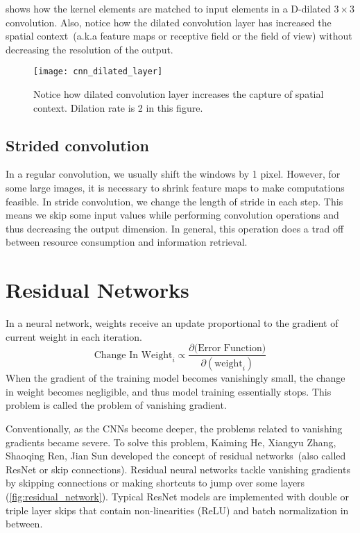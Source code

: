      shows how the kernel elements are matched to input elements in a D-dilated $3\times3$ convolution. Also, notice how the dilated convolution layer has increased the spatial context~(a.k.a feature maps or receptive field or the field of view) without decreasing the resolution of the output.
    \begin{figure}[h!]
        \centering
        \texttt{[image: cnn\_dilated\_layer]}
        \caption[Dilated convolution layer]{Notice how dilated convolution layer increases the capture of spatial context. Dilation rate is 2 in this figure.}
        \label{fig:dilated_layer}
    \end{figure}


\subsection{Strided convolution}
    In a regular convolution, we usually shift the windows by 1 pixel. However, for some large images, it is necessary to shrink feature maps to make computations feasible. In stride convolution, we change the length of stride in each step. This means we skip some input values while performing convolution operations and thus decreasing the output dimension. In general, this operation does a trad off between resource consumption and information retrieval.

\section[Residual Networks]{Residual Networks}\label{sec:resNet}

In a neural network, weights receive an update proportional to the gradient of current weight in each iteration. \begin{equation} \text{Change\ In\ Weight}_{i} \propto \frac{\partial(\text{Error\ Function)}}{\partial(\text{weight}_{i})} \end{equation} When the gradient of the training model becomes vanishingly small, the change in weight becomes negligible, and thus model training essentially stops. This problem is called the problem of vanishing gradient.

Conventionally, as the CNNs become deeper, the problems related to vanishing gradients became severe. To solve this problem, {Kaiming He, Xiangyu Zhang, Shaoqing Ren, Jian Sun}\cite{ResNet} developed the concept of residual networks~(also called ResNet or skip connections). Residual neural networks tackle vanishing gradients by skipping connections or making shortcuts to jump over some layers (\cref{fig:residual_network}). Typical ResNet models are implemented with double or triple layer skips that contain non-linearities (ReLU) and batch normalization in between.

